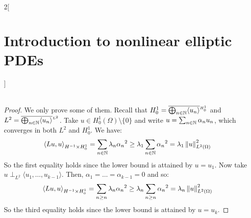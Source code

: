 \documentclass[../../../main_math.tex]{subfiles}
\begin{document}
\begin{multicols}{2}[\section{Introduction to nonlinear elliptic PDEs}]
\begin{theorem}
\begin{align*}
    \end{align*}
  \end{theorem}
  \begin{proof}
    We only prove some of them.
    Recall that $H_0^1=\overline{\bigoplus_{n\in\mathbb{N}} \langle u_n\rangle}^{{}_{H_0^1}}$ and $L^2=\overline{\bigoplus_{n\in\mathbb{N}} \langle u_n\rangle}^{{}_{L^2}}$. Take $u\in H_0^1(\Omega)\setminus\{0\}$ and write $u=\sum_{n\in\mathbb{N}}\alpha_n u_n$, which converges in both $L^2$ and $H_0^1$. We have:
    $$
      {\langle Lu,u\rangle}_{H^{-1}\times H_0^1}= \sum_{n\in\mathbb{N}}\lambda_n{\alpha_n}^2\geq \lambda_1\sum_{n\in\mathbb{N}}{\alpha_n}^2=\lambda_1\left\|u\right\|_{L^2(\Omega)}^2
    $$
    So the first equality holds since the lower bound is attained by $u=u_1$. Now take $u\perp_{L^2}\langle u_1,\dots,u_{k-1}\rangle$. Then, $\alpha_1=\dots=\alpha_{k-1}=0$ and so:
    $$
      {\langle Lu,u\rangle}_{H^{-1}\times H_0^1}= \sum_{n\geq n}\lambda_n{\alpha_n}^2\geq \lambda_n\sum_{n\geq n}{\alpha_n}^2=\lambda_n\left\|u\right\|_{L^2(\Omega)}^2
    $$
    So the third equality holds since the lower bound is attained by $u=u_k$.
  \end{proof}

\end{multicols}
\end{document}

